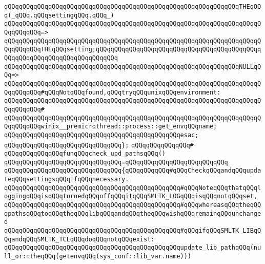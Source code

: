 \verb|qQQqqQQqqQQqqQQqqQQqqQQqqQQqqQQqqQQqqQQqqQQqqQQqqQQqqQQqqQQqqQQqTHEqQQq(_qQQq.qQQqsettingqQQq.qQQq_)|\newline
\verb|qQQqqQQqqQQqqQQqqQQqqQQqqQQqqQQqqQQqqQQqqQQqqQQqqQQqqQQqqQQqqQQqqQQqqQQqqQQqqQQq=>|\newline
\verb|qQQqqQQqqQQqqQQqqQQqqQQqqQQqqQQqqQQqqQQqqQQqqQQqqQQqqQQqqQQqqQQqqQQqqQQqqQQqqQQqTHEqQQqsetting;qQQqqQQqqQQqqQQqqQQqqQQqqQQqqQQqqQQqqQQqqQQqqQQqqQQqqQQqqQQqqQQqqQQqqQQqqQQq|\newline
\newline
\verb|qQQqqQQqqQQqqQQqqQQqqQQqqQQqqQQqqQQqqQQqqQQqqQQqqQQqqQQqqQQqqQQqNULLqQQq=>|\newline
\verb|qQQqqQQqqQQqqQQqqQQqqQQqqQQqqQQqqQQqqQQqqQQqqQQqqQQqqQQqqQQqqQQqqQQqqQQqqQQqqQQq#qQQqNotqQQqfound,qQQqtryqQQqunixqQQqenvironment:|\newline
\verb|qQQqqQQqqQQqqQQqqQQqqQQqqQQqqQQqqQQqqQQqqQQqqQQqqQQqqQQqqQQqqQQqqQQqqQQqqQQqqQQq#|\newline
\verb|qQQqqQQqqQQqqQQqqQQqqQQqqQQqqQQqqQQqqQQqqQQqqQQqqQQqqQQqqQQqqQQqqQQqqQQqqQQqqQQqwinix__premicrothread::process::get_envqQQqname;|\newline
\verb|qQQqqQQqqQQqqQQqqQQqqQQqqQQqqQQqqQQqqQQqqQQqqQQqesac;|\newline
\verb|qQQqqQQqqQQqqQQqqQQqqQQqqQQqqQQq};|\newline
\newline
\verb|qQQqqQQqqQQqqQQq#|\newline
\verb|qQQqqQQqqQQqqQQqfunqQQqcheck_upd_pathsqQQq()|\newline
\verb|qQQqqQQqqQQqqQQqqQQqqQQqqQQqqQQq=qQQqqQQqqQQqqQQqqQQqqQQqqQQq|\newline
\verb|qQQqqQQqqQQqqQQqqQQqqQQqqQQqqQQq{qQQqqQQqqQQq#qQQqCheckqQQqandqQQqupdateqQQqsettingsqQQqifqQQqnecessary.|\newline
\verb|qQQqqQQqqQQqqQQqqQQqqQQqqQQqqQQqqQQqqQQqqQQqqQQq#qQQqNoteqQQqthatqQQqloggingqQQqisqQQqturnedqQQqoffqQQqitqQQqSMLTK_LOGqQQqisqQQqnotqQQqset,|\newline
\verb|qQQqqQQqqQQqqQQqqQQqqQQqqQQqqQQqqQQqqQQqqQQqqQQq#qQQqwhereasqQQqtheqQQqpathsqQQqtoqQQqtheqQQqlibqQQqandqQQqtheqQQqwishqQQqremainqQQqunchanged|\newline
\verb|qQQqqQQqqQQqqQQqqQQqqQQqqQQqqQQqqQQqqQQqqQQqqQQq#qQQqifqQQqSMLTK_LIBqQQqandqQQqSMLTK_TCLqQQqdoqQQqnotqQQqexist:|\newline
\newline
\verb|qQQqqQQqqQQqqQQqqQQqqQQqqQQqqQQqqQQqqQQqqQQqqQQqupdate_lib_pathqQQq(null_or::theqQQq(getenvqQQq(sys_conf::lib_var.name)))|\newline
